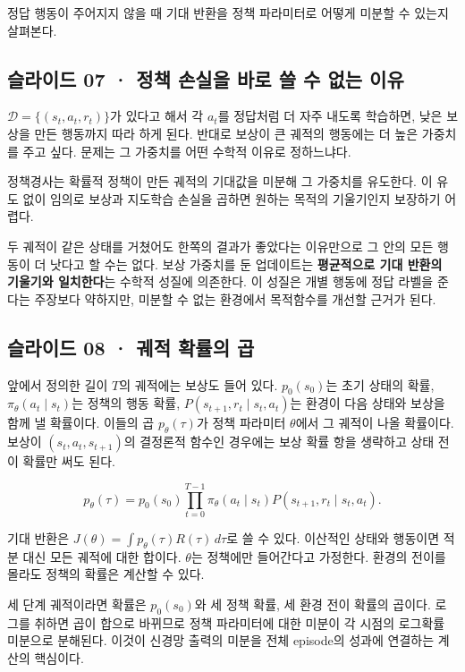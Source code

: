 \documentclass[11pt,a4paper]{article}
\begin{document}
정답 행동이 주어지지 않을 때 기대 반환을 정책 파라미터로 어떻게 미분할 수 있는지 살펴본다.\par

\subsection{슬라이드 07 · 정책 손실을 바로 쓸 수 없는 이유}

$\mathcal D=\{(s_t,a_t,r_t)\}$가 있다고 해서 각 $a_t$를 정답처럼 더 자주 내도록 학습하면, 낮은 보상을 만든 행동까지 따라 하게 된다. 반대로 보상이 큰 궤적의 행동에는 더 높은 가중치를 주고 싶다. 문제는 그 가중치를 어떤 수학적 이유로 정하느냐다.\par

정책경사는 확률적 정책이 만든 궤적의 기대값을 미분해 그 가중치를 유도한다. 이 유도 없이 임의로 보상과 지도학습 손실을 곱하면 원하는 목적의 기울기인지 보장하기 어렵다.\par

두 궤적이 같은 상태를 거쳤어도 한쪽의 결과가 좋았다는 이유만으로 그 안의 모든 행동이 더 낫다고 할 수는 없다. 보상 가중치를 둔 업데이트는 \textbf{평균적으로 기대 반환의 기울기와 일치한다}는 수학적 성질에 의존한다. 이 성질은 개별 행동에 정답 라벨을 준다는 주장보다 약하지만, 미분할 수 없는 환경에서 목적함수를 개선할 근거가 된다.\par

\subsection{슬라이드 08 · 궤적 확률의 곱}

앞에서 정의한 길이 $T$의 궤적에는 보상도 들어 있다. $p_0(s_0)$는 초기 상태의 확률, $\pi_\theta(a_t\mid s_t)$는 정책의 행동 확률, $P(s_{t+1},r_t\mid s_t,a_t)$는 환경이 다음 상태와 보상을 함께 낼 확률이다. 이들의 곱 $p_\theta(\tau)$가 정책 파라미터 $\theta$에서 그 궤적이 나올 확률이다. 보상이 $(s_t,a_t,s_{t+1})$의 결정론적 함수인 경우에는 보상 확률 항을 생략하고 상태 전이 확률만 써도 된다.\par

\[
p_\theta(\tau)=p_0(s_0)
\prod_{t=0}^{T-1}\pi_\theta(a_t\mid s_t)
P(s_{t+1},r_t\mid s_t,a_t).
\]

기대 반환은 $J(\theta)=\int p_\theta(\tau)R(\tau)\,d\tau$로 쓸 수 있다. 이산적인 상태와 행동이면 적분 대신 모든 궤적에 대한 합이다. $\theta$는 정책에만 들어간다고 가정한다. 환경의 전이를 몰라도 정책의 확률은 계산할 수 있다.\par

세 단계 궤적이라면 확률은 $p_0(s_0)$와 세 정책 확률, 세 환경 전이 확률의 곱이다. 로그를 취하면 곱이 합으로 바뀌므로 정책 파라미터에 대한 미분이 각 시점의 로그확률 미분으로 분해된다. 이것이 신경망 출력의 미분을 전체 episode의 성과에 연결하는 계산의 핵심이다.\par
\end{document}
